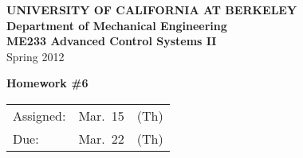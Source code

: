 \documentclass[letterpaper,12pt]{article}
\begin{document}
\begin{center}
    {\bf UNIVERSITY OF CALIFORNIA AT BERKELEY}\\
    {\bf Department of Mechanical Engineering}\\
    {\bf ME233 Advanced Control Systems II}\\
    Spring 2012\\
\end{center}
\noindent
{\Large \bf Homework \#6 }\\[-3em]
\begin{flushright}
\begin{tabular} {lll}
    Assigned: &  Mar.\ 15 & (Th) \\
    Due: & Mar.\ 22 & (Th)
\end{tabular}
\end{flushright}

\begin{enumerate}


\newpage


\end{enumerate}
\end{document}
